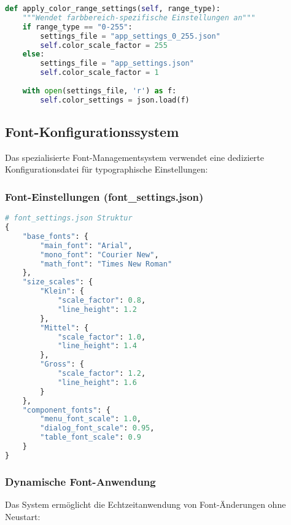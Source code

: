 \begin{lstlisting}[language=Python, caption=Farbbereich-spezifische Konfiguration]
def apply_color_range_settings(self, range_type):
    """Wendet farbbereich-spezifische Einstellungen an"""
    if range_type == "0-255":
        settings_file = "app_settings_0_255.json"
        self.color_scale_factor = 255
    else:
        settings_file = "app_settings.json" 
        self.color_scale_factor = 1
        
    with open(settings_file, 'r') as f:
        self.color_settings = json.load(f)
\end{lstlisting}

\subsection{Font-Konfigurationssystem}

Das spezialisierte Font-Managementsystem verwendet eine dedizierte Konfigurationsdatei für typographische Einstellungen:

\subsubsection{Font-Einstellungen (font\_settings.json)}
\begin{lstlisting}[language=Python, caption=Font-Konfiguration Struktur]
# font_settings.json Struktur  
{
    "base_fonts": {
        "main_font": "Arial",
        "mono_font": "Courier New",
        "math_font": "Times New Roman"
    },
    "size_scales": {
        "Klein": {
            "scale_factor": 0.8,
            "line_height": 1.2
        },
        "Mittel": {
            "scale_factor": 1.0,
            "line_height": 1.4
        },
        "Gross": {
            "scale_factor": 1.2,
            "line_height": 1.6
        }
    },
    "component_fonts": {
        "menu_font_scale": 1.0,
        "dialog_font_scale": 0.95,
        "table_font_scale": 0.9
    }
}
\end{lstlisting}

\subsubsection{Dynamische Font-Anwendung}
Das System ermöglicht die Echtzeitanwendung von Font-Änderungen ohne Neustart:

